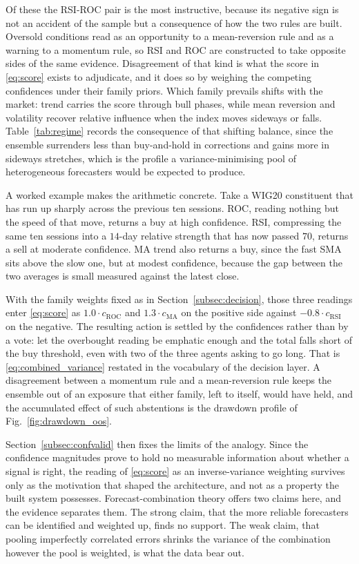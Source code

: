 Of these the RSI-ROC pair is the most instructive, because its negative sign is not an accident of the sample but a consequence of how the two rules are built. Oversold conditions read as an opportunity to a mean-reversion rule and as a warning to a momentum rule, so RSI and ROC are constructed to take opposite sides of the same evidence. Disagreement of that kind is what the score in \eqref{eq:score} exists to adjudicate, and it does so by weighing the competing confidences under their family priors. Which family prevails shifts with the market: trend carries the score through bull phases, while mean reversion and volatility recover relative influence when the index moves sideways or falls. Table~\ref{tab:regime} records the consequence of that shifting balance, since the ensemble surrenders less than buy-and-hold in corrections and gains more in sideways stretches, which is the profile a variance-minimising pool of heterogeneous forecasters would be expected to produce.

A worked example makes the arithmetic concrete. Take a WIG20 constituent that has run up sharply across the previous ten sessions. ROC, reading nothing but the speed of that move, returns a buy at high confidence. RSI, compressing the same ten sessions into a $14$-day relative strength that has now passed $70$, returns a sell at moderate confidence. MA trend also returns a buy, since the fast SMA sits above the slow one, but at modest confidence, because the gap between the two averages is small measured against the latest close.

With the family weights fixed as in Section~\ref{subsec:decision}, those three readings enter \eqref{eq:score} as $1.0 \cdot c_\text{ROC}$ and $1.3 \cdot c_\text{MA}$ on the positive side against $-0.8 \cdot c_\text{RSI}$ on the negative. The resulting action is settled by the confidences rather than by a vote: let the overbought reading be emphatic enough and the total falls short of the buy threshold, even with two of the three agents asking to go long. That is \eqref{eq:combined_variance} restated in the vocabulary of the decision layer. A disagreement between a momentum rule and a mean-reversion rule keeps the ensemble out of an exposure that either family, left to itself, would have held, and the accumulated effect of such abstentions is the drawdown profile of Fig.~\ref{fig:drawdown_oos}.

Section~\ref{subsec:confvalid} then fixes the limits of the analogy. Since the confidence magnitudes prove to hold no measurable information about whether a signal is right, the reading of \eqref{eq:score} as an inverse-variance weighting survives only as the motivation that shaped the architecture, and not as a property the built system possesses. Forecast-combination theory offers two claims here, and the evidence separates them. The strong claim, that the more reliable forecasters can be identified and weighted up, finds no support. The weak claim, that pooling imperfectly correlated errors shrinks the variance of the combination however the pool is weighted, is what the data bear out.

